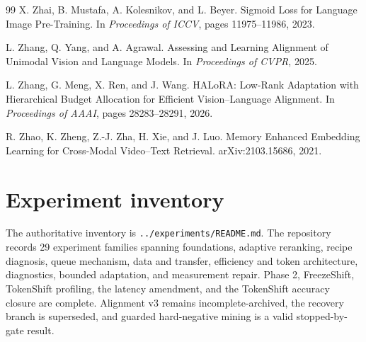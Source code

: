 \documentclass[11pt,a4paper,oneside]{report}
\begin{document}
\begin{thebibliography}{99}
X. Zhai, B. Mustafa, A. Kolesnikov, and L. Beyer.
\newblock Sigmoid Loss for Language Image Pre-Training.
\newblock In \emph{Proceedings of ICCV}, pages 11975--11986, 2023.

L. Zhang, Q. Yang, and A. Agrawal.
\newblock Assessing and Learning Alignment of Unimodal Vision and Language Models.
\newblock In \emph{Proceedings of CVPR}, 2025.

L. Zhang, G. Meng, X. Ren, and J. Wang.
\newblock HALoRA: Low-Rank Adaptation with Hierarchical Budget Allocation for
Efficient Vision--Language Alignment.
\newblock In \emph{Proceedings of AAAI}, pages 28283--28291, 2026.

R. Zhao, K. Zheng, Z.-J. Zha, H. Xie, and J. Luo.
\newblock Memory Enhanced Embedding Learning for Cross-Modal Video--Text Retrieval.
\newblock arXiv:2103.15686, 2021.

\end{thebibliography}

\clearpage
{}
\appendix
\chapter{Experiment inventory}
The authoritative inventory is \texttt{.\linebreak[1].\linebreak[1]/\linebreak[1]experiments/\linebreak[1]README.\linebreak[1]md}. The repository records 29 experiment families spanning foundations, adaptive reranking, recipe diagnosis, queue mechanism, data and transfer, efficiency and token architecture, diagnostics, bounded adaptation, and measurement repair. Phase 2, FreezeShift, TokenShift profiling, the latency amendment, and the TokenShift accuracy closure are complete. Alignment v3 remains incomplete-archived, the recovery branch is superseded, and guarded hard-negative mining is a valid stopped-by-gate result.
\end{document}
